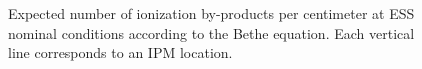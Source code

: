 \begin{figure}[!ht]
	
	\caption[Expected number of ionization by-products per centimeter at ESS nominal conditions according to the Bethe equation]{Expected number of ionization by-products per centimeter at ESS nominal conditions according to the Bethe equation. Each vertical line corresponds to an IPM location.}
	\label{chap3:ess_primary_particles}
\end{figure}
